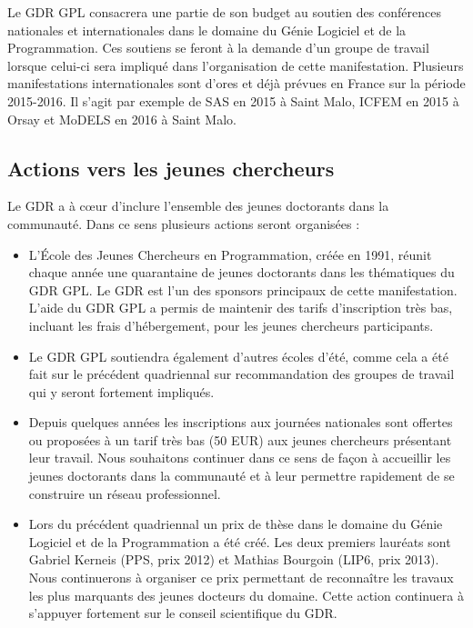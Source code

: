 \documentclass[11pt]{article}
\begin{document}
Le GDR GPL consacrera une partie de son budget au soutien des conférences
nationales et internationales dans le domaine du Génie Logiciel et de la
Programmation. Ces soutiens se feront à la demande d'un groupe de travail
lorsque celui-ci sera impliqué dans l'organisation de cette manifestation.
Plusieurs manifestations internationales sont d'ores et déjà prévues en France
sur la période 2015-2016. Il s'agit par exemple de SAS en 2015 à Saint Malo,
ICFEM en 2015 à Orsay et MoDELS en 2016 à Saint Malo.

\subsection{Actions vers les jeunes chercheurs}

Le GDR a à c{\oe}ur d'inclure l'ensemble des jeunes doctorants dans la
communauté. Dans ce sens plusieurs actions seront organisées :

\begin{itemize}
\item L'École des Jeunes Chercheurs en Programmation, créée en 1991, réunit
  chaque année une quarantaine de jeunes doctorants dans les thématiques du GDR
  GPL. Le GDR est l'un des sponsors principaux de cette manifestation.
  L'aide du GDR GPL a permis de maintenir des tarifs d'inscription très bas, incluant
  les frais d'hébergement, pour les jeunes chercheurs participants.

\item Le GDR GPL soutiendra également d'autres écoles d'été, comme cela a été
  fait sur le précédent quadriennal sur recommandation des groupes de travail
  qui y seront fortement impliqués.

\item Depuis quelques années les inscriptions aux journées nationales sont
  offertes ou proposées à un tarif très bas (50 EUR) aux jeunes chercheurs
  présentant leur travail. Nous souhaitons continuer dans ce sens de façon à
  accueillir les jeunes doctorants dans la communauté et à leur permettre
  rapidement de se construire un réseau professionnel.

\item Lors du précédent quadriennal un prix de thèse dans le domaine du Génie
  Logiciel et de la Programmation a été créé. 
  Les deux premiers lauréats sont Gabriel Kerneis (PPS, prix 2012) et Mathias
  Bourgoin (LIP6, prix 2013).
  Nous continuerons à organiser ce prix permettant de reconnaître les travaux les plus
  marquants des jeunes docteurs du domaine. 
  Cette action continuera à s'appuyer fortement sur le conseil scientifique du GDR.
 \end{itemize}
\end{document}
